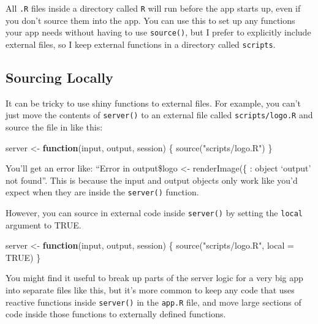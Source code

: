 \documentclass[
]{book}
\newenvironment{Shaded}{\begin{snugshade}}{\end{snugshade}}
\newcommand{\AttributeTok}[1]{\textcolor[rgb]{0.77,0.63,0.00}{#1}}
\newcommand{\ConstantTok}[1]{\textcolor[rgb]{0.00,0.00,0.00}{#1}}
\newcommand{\ControlFlowTok}[1]{\textcolor[rgb]{0.13,0.29,0.53}{\textbf{#1}}}
\newcommand{\FunctionTok}[1]{\textcolor[rgb]{0.00,0.00,0.00}{#1}}
\newcommand{\NormalTok}[1]{#1}
\newcommand{\OtherTok}[1]{\textcolor[rgb]{0.56,0.35,0.01}{#1}}
\newcommand{\StringTok}[1]{\textcolor[rgb]{0.31,0.60,0.02}{#1}}
\begin{document}
All \texttt{.R} files inside a directory called \texttt{R} will run before the app starts up, even if you don't source them into the app. You can use this to set up any functions your app needs without having to use \texttt{source()}, but I prefer to explicitly include external files, so I keep external functions in a directory called \texttt{scripts}.

\hypertarget{sourcing-locally}{%
\subsection{Sourcing Locally}\label{sourcing-locally}}

It can be tricky to use shiny functions to external files. For example, you can't just move the contents of \texttt{server()} to an external file called \texttt{scripts/logo.R} and source the file in like this:

\begin{Shaded}
\begin{Highlighting}[]
\NormalTok{server }\OtherTok{\textless{}{-}} \ControlFlowTok{function}\NormalTok{(input, output, session) \{}
    \FunctionTok{source}\NormalTok{(}\StringTok{"scripts/logo.R"}\NormalTok{)}
\NormalTok{\} }
\end{Highlighting}
\end{Shaded}

You'll get an error like: ``Error in output\$logo \textless- renderImage(\{ : object `output' not found''. This is because the input and output objects only work like you'd expect when they are inside the \texttt{server()} function.

However, you can source in external code inside \texttt{server()} by setting the \texttt{local} argument to TRUE.

\begin{Shaded}
\begin{Highlighting}[]
\NormalTok{server }\OtherTok{\textless{}{-}} \ControlFlowTok{function}\NormalTok{(input, output, session) \{}
    \FunctionTok{source}\NormalTok{(}\StringTok{"scripts/logo.R"}\NormalTok{, }\AttributeTok{local =} \ConstantTok{TRUE}\NormalTok{)}
\NormalTok{\} }
\end{Highlighting}
\end{Shaded}

You might find it useful to break up parts of the server logic for a very big app into separate files like this, but it's more common to keep any code that uses reactive functions inside \texttt{server()} in the \texttt{app.R} file, and move large sections of code inside those functions to externally defined functions.
\end{document}
